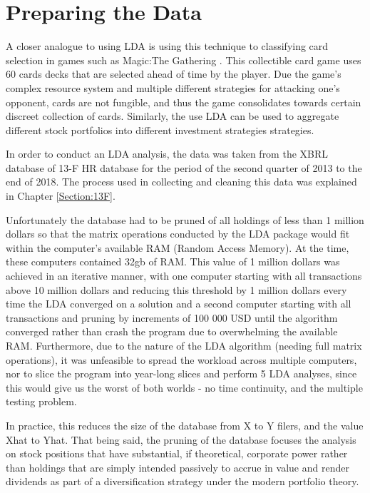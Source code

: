 \section{Preparing the Data}
A closer analogue to using LDA is using this technique to classifying card selection in games such as Magic:The Gathering \citep{Hlynsson2017}.  This collectible card game uses 60 cards decks that are selected ahead of time by the player.  Due the game's complex resource system and multiple different strategies for attacking one's opponent, cards are not fungible, and thus the game consolidates towards certain discreet collection of cards.  Similarly, the use LDA can be used to aggregate different stock portfolios into different investment strategies strategies.  

In order to conduct an LDA analysis, the data was taken from the XBRL database of 13-F HR database for the period of the second quarter of 2013 to the end of 2018.  The process used in collecting and cleaning this data was explained in Chapter \ref{Section:13F}.  

Unfortunately the database had to be pruned of all holdings of less than 1 million dollars so that the matrix operations conducted by the LDA package would fit within the computer's available RAM (Random Access Memory).  At the time, these computers contained 32gb of RAM. This value of 1 million dollars was achieved in an iterative manner, with one computer starting with all transactions above 10 million dollars and reducing this threshold by 1 million dollars every time the LDA converged on a solution and a second computer starting with all transactions and pruning by increments of 100 000 USD until the algorithm converged rather than crash the program due to overwhelming the available RAM.  Furthermore, due to the nature of the LDA algorithm (needing full matrix operations), it was unfeasible to spread the workload across multiple computers, nor to slice the program into year-long slices and perform 5 LDA analyses, since this would give us the worst of both worlds - no time continuity, and the multiple testing problem. 

In practice, this reduces the size of the database from X to Y filers, and the value Xhat to Yhat.  That being said, the pruning of the database focuses the analysis on stock positions that have substantial, if theoretical, corporate power
rather than holdings that are simply intended passively to accrue in value and render dividends as part of a diversification strategy under the modern portfolio theory.

